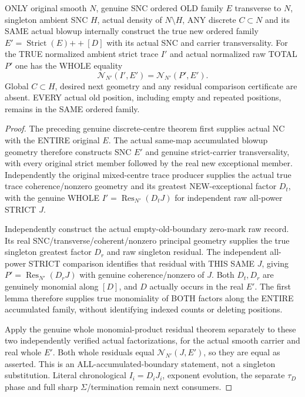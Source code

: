 \begin{theorem}
\label{hir:sharp-actual-mixed-discrete-whole-accumulated-trace-residual}
\leanok
ONLY original smooth $N$, genuine SNC ordered OLD family $E$ transverse
to $N$, singleton ambient SNC $H$, actual density of $N\setminus H$,
ANY discrete $C\subset N$ and its SAME actual blowup internally construct
the true new ordered family
$E'=\operatorname{Strict}(E)\mathbin{+\!+}[D]$ with its actual SNC
and carrier transversality. For the TRUE normalized ambient strict trace
$I'$ and actual normalized raw TOTAL $P'$ one has the WHOLE equality
\[
 \mathcal N_{N'}(I',E')=\mathcal N_{N'}(P',E').
\]
Global $C\subset H$, desired next geometry and any residual comparison
certificate are absent. EVERY actual old position, including empty and
repeated positions, remains in the SAME ordered family.
\end{theorem}
\begin{proof}
The preceding genuine discrete-centre theorem first supplies actual NC
with the ENTIRE original $E$. The actual same-map accumulated blowup
geometry therefore constructs SNC $E'$ and genuine strict-carrier
transversality, with every original strict member followed by the real
new exceptional member. Independently the original mixed-centre trace
producer supplies the actual true trace coherence/nonzero geometry and
its greatest NEW-exceptional factor $D_t$, with the genuine WHOLE
$I'=\operatorname{Res}_{N'}(D_tJ)$ for independent raw all-power STRICT
$J$.

Independently construct the actual empty-old-boundary zero-mark raw record.
Its real SNC/transverse/coherent/nonzero principal geometry supplies the
true singleton greatest factor $D_r$ and raw singleton residual. The
independent all-power STRICT comparison identifies that residual with
THIS SAME $J$, giving $P'=\operatorname{Res}_{N'}(D_rJ)$ with genuine
coherence/nonzero of $J$. Both $D_t,D_r$ are genuinely monomial along
$[D]$, and $D$ actually occurs in the real $E'$. The first lemma
therefore supplies true monomiality of BOTH factors along the ENTIRE
accumulated family, without identifying indexed counts or deleting positions.

Apply the genuine whole monomial-product residual theorem separately to
these two independently verified actual factorizations, for the actual
smooth carrier and real whole $E'$. Both whole residuals equal
$\mathcal N_{N'}(J,E')$, so they are equal as asserted. This is an
ALL-accumulated-boundary statement, not a singleton substitution.
Literal chronological $I_i=D_iJ_i$, exponent evolution, the separate
$\tau_D$ phase and full sharp $\Sigma$/termination remain next consumers.
\end{proof}
